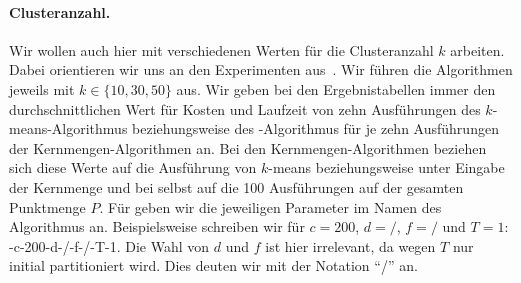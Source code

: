 \paragraph{Clusteranzahl.} Wir wollen auch hier mit verschiedenen Werten für die Clusteranzahl $k$ arbeiten.
Dabei orientieren wir uns an den Experimenten aus~\cite{AckermannMRSLS12,FichtenbergerGSSS13}. Wir führen die Algorithmen
jeweils mit $k \in \{ 10, 30, 50 \}$ aus.
\absatz
Wir geben bei den Ergebnistabellen immer den durchschnittlichen Wert für Kosten und Laufzeit von zehn Ausführungen
des $k$-means-Algorithmus beziehungsweise des \kmpp-Algorithmus für je zehn Ausführungen der Kernmengen-Algorithmen an.
Bei den Kernmengen-Algorithmen beziehen sich diese Werte auf die Ausführung von $k$-means beziehungsweise \kmpp{} unter
Eingabe der Kernmenge und bei \kmpp{} selbst auf die 100 Ausführungen auf der gesamten Punktmenge $P$.
Für \CsTwo{} geben wir die jeweiligen Parameter im Namen des Algorithmus an. Beispielsweise schreiben wir für
$c = 200$, $d=/$, $f=/$ und $T=1$: \CsTwo-c-200-d-/-f-/-T-1.
Die Wahl von $d$ und $f$ ist hier irrelevant, da wegen $T$ nur initial partitioniert wird. Dies deuten wir mit der
Notation "`/"' an.

